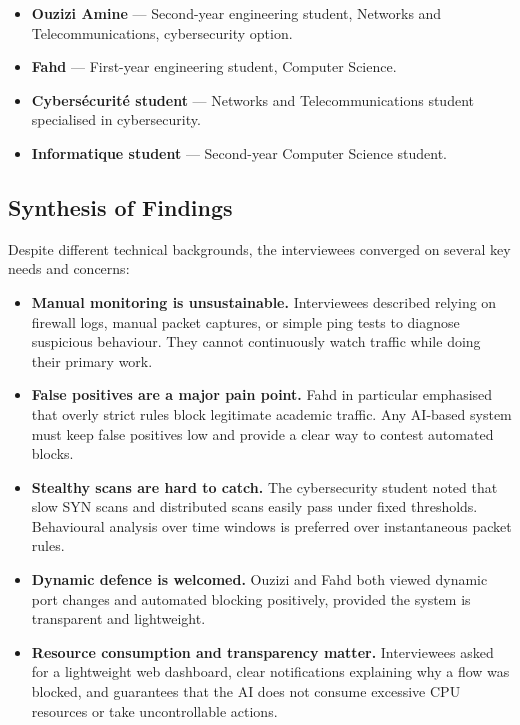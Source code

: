 \begin{itemize}
    \item \textbf{Ouzizi Amine} --- Second-year engineering student, Networks and Telecommunications, cybersecurity option.
    \item \textbf{Fahd} --- First-year engineering student, Computer Science.
    \item \textbf{Cybers\'{e}curit\'{e} student} --- Networks and Telecommunications student specialised in cybersecurity.
    \item \textbf{Informatique student} --- Second-year Computer Science student.
\end{itemize}

\subsection{Synthesis of Findings}

Despite different technical backgrounds, the interviewees converged on several key needs and concerns:

\begin{itemize}
    \item \textbf{Manual monitoring is unsustainable.} Interviewees described relying on firewall logs, manual packet captures, or simple ping tests to diagnose suspicious behaviour. They cannot continuously watch traffic while doing their primary work.
    \item \textbf{False positives are a major pain point.} Fahd in particular emphasised that overly strict rules block legitimate academic traffic. Any AI-based system must keep false positives low and provide a clear way to contest automated blocks.
    \item \textbf{Stealthy scans are hard to catch.} The cybersecurity student noted that slow SYN scans and distributed scans easily pass under fixed thresholds. Behavioural analysis over time windows is preferred over instantaneous packet rules.
    \item \textbf{Dynamic defence is welcomed.} Ouzizi and Fahd both viewed dynamic port changes and automated blocking positively, provided the system is transparent and lightweight.
    \item \textbf{Resource consumption and transparency matter.} Interviewees asked for a lightweight web dashboard, clear notifications explaining why a flow was blocked, and guarantees that the AI does not consume excessive CPU resources or take uncontrollable actions.
\end{itemize}

